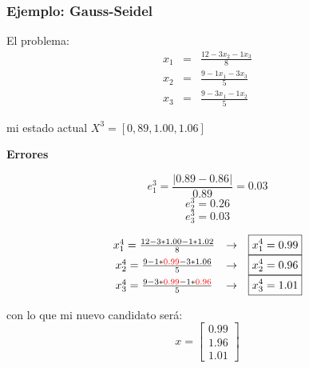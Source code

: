 \documentclass[xcolor=svgnames]{beamer} %
\theoremstyle{plain}
\renewcommand{\textbf}[1]{{\bfseries\textcolor{redUnq2}{#1}}}
\theoremstyle{definition}
\begin{document}
\begin{frame}
\frametitle{Ejemplo: Gauss-Seidel}

\begin{minipage}{.4\linewidth}
El problema:\vspace{-5pt}
$$\begin{array}{ccc}
x_1 &=& \frac{12-3x_2-1x_3}{8}\\
x_2 &=& \frac{9-1x_1-3x_3}{5}\\
x_3 &=& \frac{9-3x_1-1x_2}{5}
\end{array}$$

mi estado actual $X^3 =[0,89,1.00,1.06]$\vspace{-5pt}
\end{minipage} \vrule \begin{minipage}{.5\linewidth}
\begin{center}
  \textbf{Errores}
\end{center}
$$e_1^3 = \frac{|0.89 -0.86|}{0.89} 	= 0.03$$
$$e_2^3 = 0.26$$
$$e_3^3 = 0.03$$
\end{minipage}

\begin{minipage}{.65\linewidth}
\pause
$$\begin{array}{ccc}
x_1^4 = \frac{12-3*1.00-1*1.02}{8} & \rightarrow & \boxed{x_1^4 = 0.99}\\
x_2^4 = \frac{9-1*{\color{red}0.99}-3*1.06}{5} &\rightarrow & \boxed{x_2^4 = 0.96}\\
x_3^4 = \frac{9-3*{\color{red}0.99}-1*{\color{red}0.96}}{5} &\rightarrow & \boxed{x_3^4 = 1.01}
\end{array}$$

\end{minipage}\pause \vrule \begin{minipage}{.3\linewidth}
con lo que mi nuevo candidato será:
$$x = \begin{bmatrix}
0.99\\
1.96\\
1.01
\end{bmatrix}$$
\end{minipage}

\end{frame}
\end{document}
